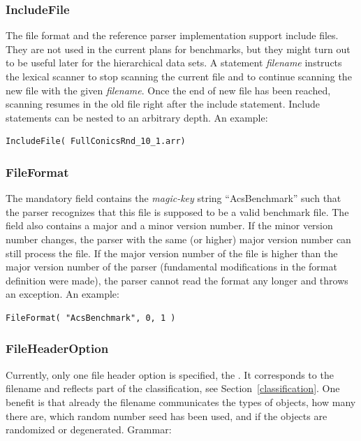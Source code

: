 \subsubsection{IncludeFile}
\label{inclfiles}

The file format and the reference parser implementation support
include files. They are not used in the current plans for benchmarks,
but they might turn out to be useful later for the hierarchical data
sets. A statement \textit{filename}\ts{)} instructs
the lexical scanner to stop scanning the current file and to continue scanning
the new file with the given \textit{filename}. Once the end of new
file has been reached, scanning resumes in the old file right after
the include statement. Include statements can be nested to an
arbitrary depth. An example:

\begin{verbatim}
IncludeFile( FullConicsRnd_10_1.arr)
\end{verbatim}

\subsubsection{FileFormat}
\label{headerformat}

The mandatory  field contains the \emph{magic-key\/}
string ``AcsBenchmark'' such that the parser recognizes that this file
is supposed to be a valid benchmark file.  The field also contains a
major and a minor version number. If the minor version number changes,
the parser with the same (or higher) major version number can still
process the file. If the major version number of the file is higher
than the major version number of the parser (fundamental modifications
in the format definition were made), the parser cannot read the format
any longer and throws an exception. An example:

\begin{verbatim}
FileFormat( "AcsBenchmark", 0, 1 )
\end{verbatim}

\subsubsection{FileHeaderOption}
\label{headeropt}

Currently, only one file header option is specified, the
. It corresponds to the filename and reflects part
of the classification, see Section~\ref{classification}. One benefit
is that already the filename communicates the types of objects, how
many there are, which random number seed has been used, and if the
objects are randomized or degenerated. Grammar:

